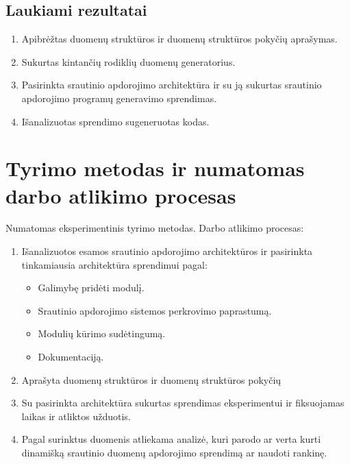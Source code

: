 \documentclass{VUMIFPSbakalaurinis}
\begin{document}
\subsection{Laukiami rezultatai}
    \begin{enumerate}
        \item Apibrėžtas duomenų struktūros ir duomenų struktūros pokyčių aprašymas.
        \item Sukurtas kintančių rodiklių duomenų generatorius.
        \item Pasirinkta srautinio apdorojimo architektūra ir su ją sukurtas srautinio apdorojimo programų generavimo sprendimas. 
        \item Išanalizuotas sprendimo sugeneruotas kodas. 
    \end{enumerate}
    \vspace{1 mm}
\section{Tyrimo metodas ir numatomas darbo atlikimo procesas}
Numatomas eksperimentinis tyrimo metodas.
Darbo atlikimo procesas:
\begin{enumerate}
    \item Išanalizuotos esamos srautinio apdorojimo architektūros ir pasirinkta tinkamiausia architektūra sprendimui pagal:
    	\begin{itemize}
		\item Galimybę pridėti modulį.
		\item Srautinio apdorojimo sistemos perkrovimo paprastumą.
		\item Modulių kūrimo sudėtingumą.
		\item Dokumentaciją.
	\end{itemize}
    \item Aprašyta duomenų struktūros ir duomenų struktūros pokyčių  
    \item Su pasirinkta architektūra sukurtas sprendimas eksperimentui ir fiksuojamas laikas ir atliktos užduotis.
    \item Pagal surinktus duomenis atliekama analizė, kuri parodo ar verta kurti dinamišką srautinio duomenų apdorojimo sprendimą 
    ar naudoti rankinę.  
\end{enumerate}
\end{document}
